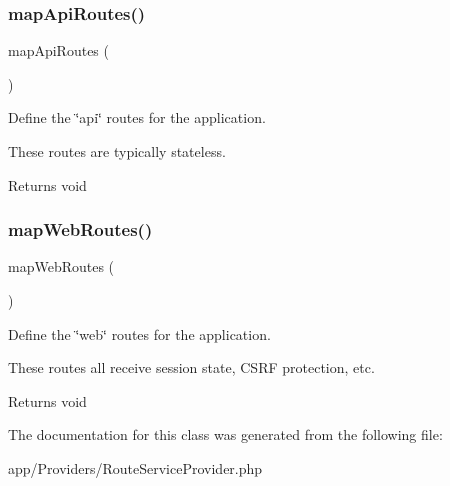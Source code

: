 \subsubsection{\texorpdfstring{map\+Api\+Routes()}{mapApiRoutes()}}
{\footnotesize\ttfamily map\+Api\+Routes (\begin{DoxyParamCaption}{ }\end{DoxyParamCaption})\hspace{0.3cm}{\ttfamily [protected]}}

Define the \char`\"{}api\char`\"{} routes for the application.

These routes are typically stateless.

\begin{DoxyReturn}{Returns}
void 
\end{DoxyReturn}
\mbox{\label{class_app_1_1_providers_1_1_route_service_provider_ac887962db9a9a8f344572bd205a02165}} 
\subsubsection{\texorpdfstring{map\+Web\+Routes()}{mapWebRoutes()}}
{\footnotesize\ttfamily map\+Web\+Routes (\begin{DoxyParamCaption}{ }\end{DoxyParamCaption})\hspace{0.3cm}{\ttfamily [protected]}}

Define the \char`\"{}web\char`\"{} routes for the application.

These routes all receive session state, C\+S\+RF protection, etc.

\begin{DoxyReturn}{Returns}
void 
\end{DoxyReturn}


The documentation for this class was generated from the following file\+:\begin{DoxyCompactItemize}
\item 
app/\+Providers/Route\+Service\+Provider.\+php\end{DoxyCompactItemize}
